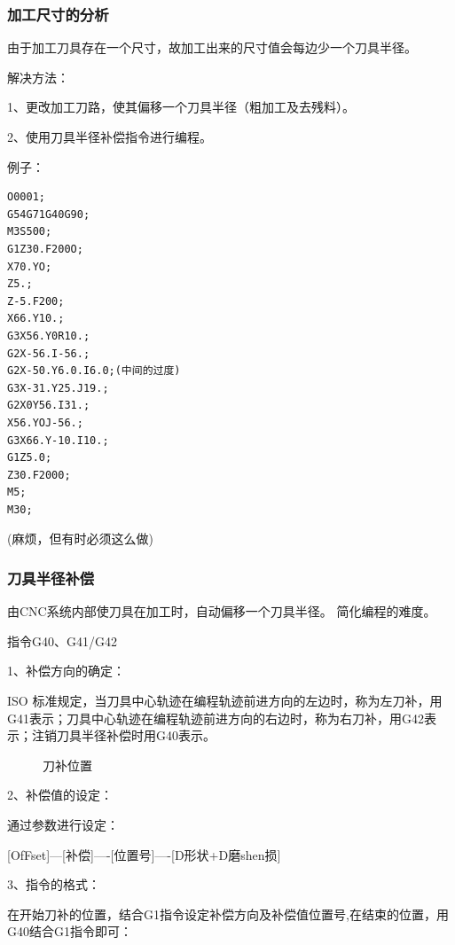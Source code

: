 \subsubsection{加工尺寸的分析}

由于加工刀具存在一个尺寸，故加工出来的尺寸值会每边少一个刀具半径。

解决方法：

1、更改加工刀路，使其偏移一个刀具半径（粗加工及去残料）。

2、使用刀具半径补偿指令进行编程。

例子：

\begin{lstlisting}
O0001;
G54G71G40G90;
M3S500;
G1Z30.F200O;
X70.YO;
Z5.;
Z-5.F200;
X66.Y10.;
G3X56.Y0R10.;
G2X-56.I-56.;
G2X-50.Y6.0.I6.0;(中间的过度)
G3X-31.Y25.J19.;
G2X0Y56.I31.;
X56.YOJ-56.;
G3X66.Y-10.I10.;
G1Z5.0;
Z30.F2000;
M5;
M30;
\end{lstlisting}
(麻烦，但有时必须这么做)


\subsubsection{刀具半径补偿}

由CNC系统内部使刀具在加工时，自动偏移一个刀具半径。
简化编程的难度。

指令G40、G41/G42

1、补偿方向的确定：

ISO 标准规定，当刀具中心轨迹在编程轨迹前进方向的左边时，称为左刀补，用G41表示；刀具中心轨迹在编程轨迹前进方向的右边时，称为右刀补，用G42表示；注销刀具半径补偿时用G40表示。

\begin{figure}[h]
	\centering
{}
\caption{刀补位置}
\label{fig:7-1}
\end{figure}

2、补偿值的设定：

通过参数进行设定：

[OfFset]---[补偿]----[位置号]----[D形状+D磨shen损]

3、指令的格式：

在开始刀补的位置，结合G1指令设定补偿方向及补偿值位置号,在结束的位置，用G40结合G1指令即可：

